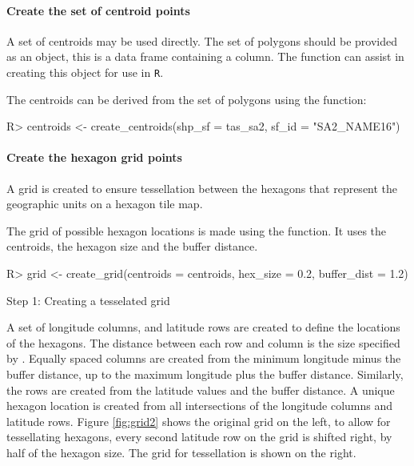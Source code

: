 \documentclass[
]{jss}
\begin{document}
\hypertarget{create-the-set-of-centroid-points}{%
\paragraph{Create the set of centroid
points}\label{create-the-set-of-centroid-points}}

A set of centroids may be used directly. The set of polygons should be
provided as an  object, this is a data frame containing a
 column. The  function can assist in
creating this object for use in \texttt{R}.

The centroids can be derived from the set of polygons using the
 function:

\begin{CodeChunk}

\begin{CodeInput}
R> centroids <- create_centroids(shp_sf = tas_sa2, sf_id = "SA2_NAME16")
\end{CodeInput}
\end{CodeChunk}

\hypertarget{create-the-hexagon-grid-points}{%
\paragraph{Create the hexagon grid
points}\label{create-the-hexagon-grid-points}}

A grid is created to ensure tessellation between the hexagons that
represent the geographic units on a hexagon tile map.

The grid of possible hexagon locations is made using the
 function. It uses the centroids, the hexagon size and
the buffer distance.

\begin{CodeChunk}

\begin{CodeInput}
R> grid <- create_grid(centroids = centroids, hex_size = 0.2, buffer_dist = 1.2)
\end{CodeInput}
\end{CodeChunk}

Step 1: Creating a tesselated grid

A set of longitude columns, and latitude rows are created to define the
locations of the hexagons. The distance between each row and column is
the size specified by . Equally spaced columns are
created from the minimum longitude minus the buffer distance, up to the
maximum longitude plus the buffer distance. Similarly, the rows are
created from the latitude values and the buffer distance. A unique
hexagon location is created from all intersections of the longitude
columns and latitude rows. Figure \ref{fig:grid2} shows the original
grid on the left, to allow for tessellating hexagons, every second
latitude row on the grid is shifted right, by half of the hexagon size.
The grid for tessellation is shown on the right.
\end{document}
